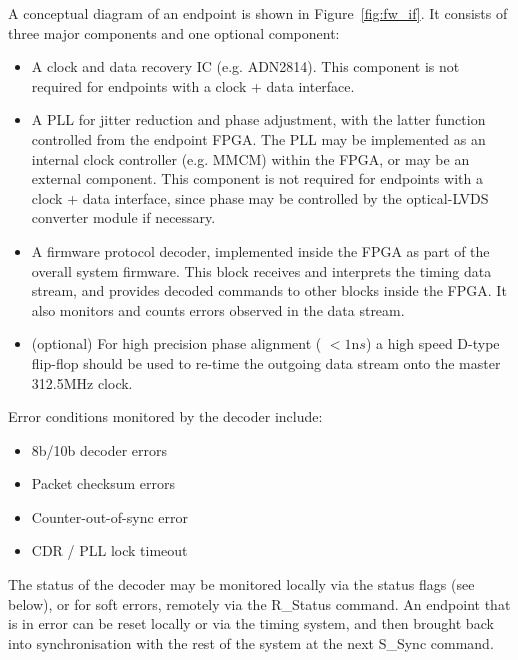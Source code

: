 \documentclass[a4paper,11pt]{article}
\begin{document}
A conceptual diagram of an endpoint is shown in Figure~\ref{fig:fw_if}. It consists of three major components and one optional component:

\begin{itemize}
	\item A clock and data recovery IC (e.g. ADN2814). This component is not required for endpoints with a clock + data interface.
	\item A PLL for jitter reduction and phase adjustment, with the latter function controlled from the endpoint FPGA. The PLL may be implemented as an internal clock controller (e.g. MMCM) within the FPGA, or may be an external component. This component is not required for endpoints with a clock + data interface, since phase may be controlled by the optical-LVDS converter module if necessary.
	\item A firmware protocol decoder, implemented inside the FPGA as part of the overall system firmware. This block receives and interprets the timing data stream, and provides decoded commands to other blocks inside the FPGA. It also monitors and counts errors observed in the data stream.
	\item(optional) For high precision phase alignment ( $< 1{\mathrm ns}$) a high speed D-type flip-flop should be used to re-time the outgoing data stream onto the master 312.5MHz clock.
\end{itemize}

Error conditions monitored by the decoder include:

\begin{itemize}
	\item 8b/10b decoder errors
	\item Packet checksum errors
	\item Counter-out-of-sync error
	\item CDR / PLL lock timeout
\end{itemize}

The status of the decoder may be monitored locally via the status flags (see below), or for soft errors, remotely via the R\_Status command. An endpoint that is in error can be reset locally or via the timing system, and then brought back into synchronisation with the rest of the system at the next S\_Sync command.
\end{document}
